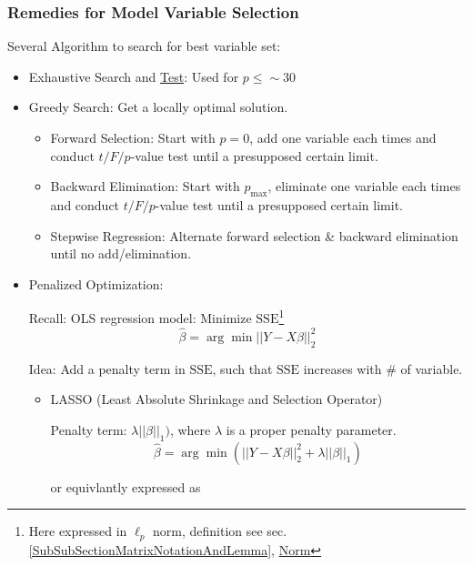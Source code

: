 \subsubsection{Remedies for Model Variable Selection}
    Several Algorithm to search for best variable set:
\begin{itemize}[topsep=2pt,itemsep=0pt]
\item Exhaustive Search and \hyperlink{ModelValidationCriteria}{Test}: Used for $ p\leq \sim 30 $
\item Greedy Search: Get a locally optimal solution.
\begin{itemize}[topsep=2pt,itemsep=2pt]
    \item Forward Selection: Start with $ p=0 $, add one variable each times and conduct $ t/F/p $-value test until a presupposed certain limit.
    \item Backward Elimination: Start with $ p_\mathrm{max} $, eliminate one variable each times and conduct $ t/F/p $-value test until a presupposed certain limit.
    \item Stepwise Regression: Alternate forward selection \& backward elimination until no add/elimination.
\end{itemize}

\item Penalized Optimization: 

Recall: OLS regression model: Minimize $ \mathrm{SSE}  $\footnote{Here expressed in $ \ell_p  $ norm, definition see sec.\ref{SubSubSectionMatrixNotationAndLemma}, \hyperlink{NormDefinition}{Norm}}
\begin{equation}
    \hat{\beta }=\arg\min ||Y-X\beta ||_2 ^2
\end{equation}

Idea: Add a penalty term in $ \mathrm{SSE} $, such that $ \mathrm{SSE} $ increases with \# of variable.

\begin{itemize}[topsep=2pt,itemsep=2pt]  
\item LASSO (Least Absolute Shrinkage and Selection Operator)
     
Penalty term: $ \lambda||\beta ||_1) $, where $ \lambda  $ is a proper penalty parameter.
\begin{equation}
    \hat{\beta }=\arg\min (||Y-X\beta ||_2 ^2+\lambda||\beta ||_1)
\end{equation}

    or equivlantly expressed as 


\end{itemize}
\end{itemize}
